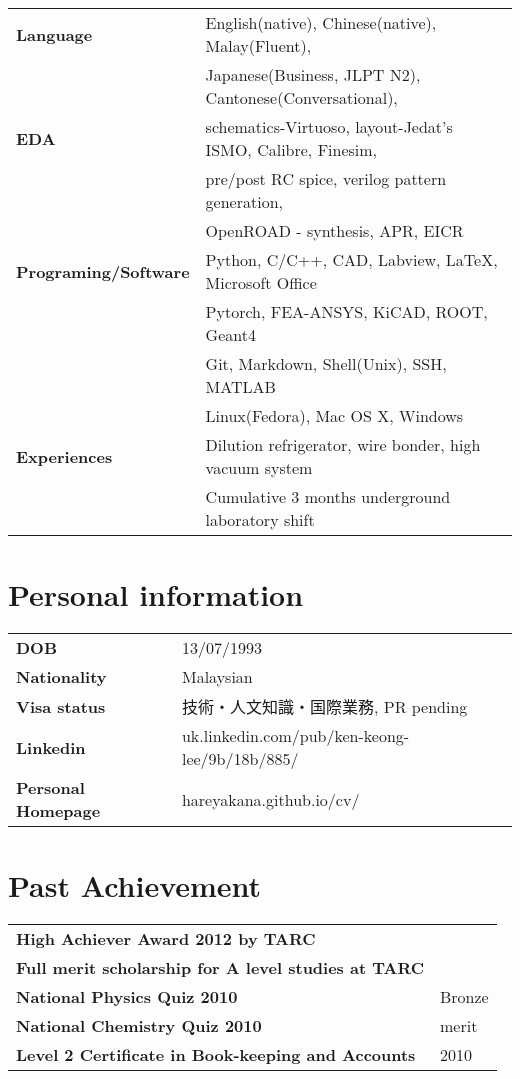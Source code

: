 \documentclass[a4paper, oneside, final]{scrartcl} %
\begin{document}
\begin{center}
\begin{tabular}{ @{} >{\bfseries}l @{\hspace{6ex}} l }
Language & English(native), Chinese(native), Malay(Fluent), \\ & Japanese(Business, JLPT N2), Cantonese(Conversational),  \\
EDA &schematics-Virtuoso, layout-Jedat's ISMO, Calibre, Finesim, \\
& pre/post RC spice, verilog pattern generation, \\
& OpenROAD - synthesis, APR, EICR\\
Programing/Software & Python, C/C++, CAD, Labview, LaTeX, Microsoft Office\\
 & Pytorch, FEA-ANSYS, KiCAD, ROOT, Geant4 \\
 & Git, Markdown, Shell(Unix), SSH, MATLAB\\
 & Linux(Fedora), Mac OS X, Windows\\
Experiences & Dilution refrigerator, wire bonder, high vacuum system \\
& Cumulative 3 months underground laboratory shift\\ 
\end{tabular}

\normalsize
\section{Personal information}
\begin{tabular}{ @{} >{\bfseries}l @{\hspace{6ex}} l }
DOB & 13/07/1993\\
Nationality & Malaysian\\
Visa status & 技術・人文知識・国際業務, PR pending\\
Linkedin & uk.linkedin.com/pub/ken-keong-lee/9b/18b/885/\\
Personal Homepage & hareyakana.github.io/cv/
\end{tabular}

\section{Past Achievement}
\begin{tabular}{ @{} >{\bfseries}l @{\hspace{6ex}} l }
High Achiever Award 2012 by TARC\\
Full merit scholarship for A level studies at TARC\\
National Physics Quiz 2010 & Bronze\\
National Chemistry Quiz 2010 & merit\\
Level 2 Certificate in Book-keeping and Accounts & 2010\\
\end{tabular}


\end{center}
\end{document}

